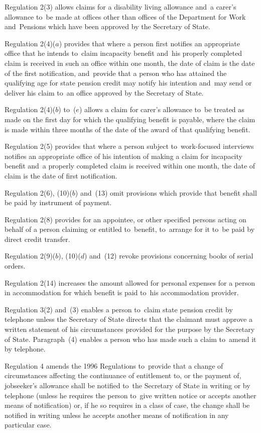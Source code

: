 \documentclass[12pt,a4paper]{article}
\begin{document}
Regulation 2(3) allows claims for a disability living allowance and~a carer’s allowance to~be made at offices other than offices of the Department for Work and~Pensions which have been approved by the Secretary of State.

Regulation 2(4)($a$)  provides that where a person first notifies an appropriate office that he intends to~claim incapacity benefit and~his properly completed claim is received in such an office within one month, the date of claim is the date of the first notification, and~provide that a person who has attained the qualifying age for state pension credit may notify his intention and~may send or deliver his claim to~an office approved by the Secretary of State.

Regulation 2(4)($b$)  to~($e$)  allows a claim for carer’s allowance to~be treated as made on the first day for which the qualifying benefit is payable, where the claim is made within three months of the date of the award of that qualifying benefit.

Regulation 2(5) provides that where a person subject to~work-focused interviews notifies an appropriate office of his intention of making a claim for incapacity benefit and~a properly completed claim is received within one month, the date of claim is the date of first notification.

Regulation 2(6), (10)($b$)  and~(13) omit provisions which provide that benefit shall be paid by instrument of payment.

Regulation 2(8) provides for an appointee, or other specified persons acting on behalf of a person claiming or entitled to~benefit, to~arrange for it to~be paid by direct credit transfer.

Regulation 2(9)($b$), (10)($d$)  and~(12) revoke provisions concerning books of serial orders.

Regulation 2(14) increases the amount allowed for personal expenses for a person in accommodation for which benefit is paid to~his accommodation provider.

Regulation 3(2) and~(3) enables a person to~claim state pension credit by telephone unless the Secretary of State directs that the claimant must approve a written statement of his circumstances provided for the purpose by the Secretary of State. Paragraph~(4) enables a person who has made such a claim to~amend it by telephone.

Regulation 4 amends the 1996 Regulations to~provide that a change of circumstances affecting the continuance of entitlement to, or the payment of, jobseeker’s allowance shall be notified to~the Secretary of State in writing or by telephone (unless he requires the person to~give written notice or accepts another means of notification) or, if he so requires in a class of case, the change shall be notified in writing unless he accepts another means of notification in any particular case.
\end{document}
